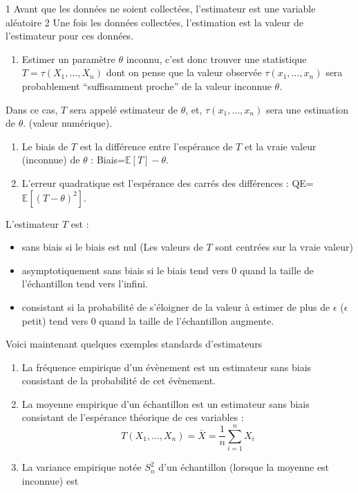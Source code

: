 \documentclass[]{book}
\providecommand{\tightlist}{%
  \setlength{\itemsep}{0pt}\setlength{\parskip}{0pt}}
\theoremstyle{definition}
\theoremstyle{definition}
\theoremstyle{remark}
\begin{document}
1 Avant que les données ne soient collectées, l'estimateur est une
variable aléatoire 2 Une fois les données collectées, l'estimation est
la valeur de l'estimateur pour ces données.

\begin{enumerate}
\def\labelenumi{\arabic{enumi}.}
\setcounter{enumi}{1}
\tightlist
\item
  Estimer un paramètre \(\theta\) inconnu, c'est donc trouver une
  statistique \(T=\tau(X_1,\ldots,X_n)\) dont on pense que la valeur
  observée \(\tau(x_1,\ldots,x_n)\) sera probablement ``suffisamment
  proche'' de la valeur inconnue \(\theta\).
\end{enumerate}

Dans ce cas, \(T\) sera appelé estimateur de \(\theta\), et,
\(\tau(x_1,\ldots,x_n)\) sera une estimation de \(\theta\). (valeur
numérique).

\begin{enumerate}
\def\labelenumi{\arabic{enumi}.}
\tightlist
\item
  Le biais de \(T\) est la différence entre l'espérance de \(T\) et la
  vraie valeur (inconnue) de \(\theta\) : Biais=\(\mathbb E[T]-\theta\).
\item
  L'erreur quadratique est l'espérance des carrés des différences : QE=
  \(\mathbb E[(T-\theta)^2]\).
\end{enumerate}

L'estimateur \(T\) est :

\begin{itemize}
\tightlist
\item
  sans biais si le biais est nul (Les valeurs de \(T\) sont centrées sur
  la vraie valeur)
\item
  asymptotiquement sans biais si le biais tend vers 0 quand la taille de
  l'échantillon tend vers l'infini.
\item
  consistant si la probabilité de s'éloigner de la valeur à estimer de
  plus de \(\epsilon\) (\(\epsilon\) petit) tend vers 0 quand la taille
  de l'échantillon augmente.
\end{itemize}

Voici maintenant quelques exemples standards d'estimateurs

\begin{enumerate}
\def\labelenumi{\arabic{enumi}.}
\item
  La fréquence empirique d'un évènement est un estimateur sans biais
  consistant de la probabilité de cet évènement.
\item
  La moyenne empirique d'un échantillon est un estimateur sans biais
  consistant de l'espérance théorique de ces variables :
  \[T(X_1,\ldots,X_n)=\bar
  X=\frac{1}{n}\displaystyle\sum_{i=1}^nX_i\]
\item
  La variance empirique notée \(S_n^2\) d'un échantillon (lorsque la
  moyenne est inconnue) est
\end{enumerate}
\end{document}
